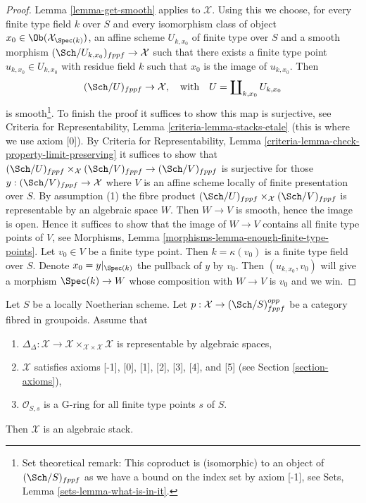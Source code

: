 \begin{proof}
Lemma \ref{lemma-get-smooth} applies to $\mathcal{X}$. Using this we
choose, for every finite type field $k$ over $S$ and every
isomorphism class of object $x_0 \in \Ob(\mathcal{X}_{\Spec(k)})$,
an affine scheme $U_{k, x_0}$ of finite type over $S$ and a smooth morphism
$(\Sch/U_{k, x_0})_{fppf} \to \mathcal{X}$ such that there exists a finite
type point $u_{k, x_0} \in U_{k, x_0}$ with residue field $k$ such that $x_0$
is the image of $u_{k, x_0}$. Then
$$
(\Sch/U)_{fppf} \to \mathcal{X},
\quad\text{with}\quad
U = \coprod\nolimits_{k, x_0} U_{k, x_0}
$$
is smooth\footnote{Set theoretical remark: This coproduct is (isomorphic)
to an object of $(\Sch/S)_{fppf}$ as we have a bound on the index set
by axiom [-1], see Sets, Lemma \ref{sets-lemma-what-is-in-it}.}.
To finish the proof it suffices to show this map is surjective,
see Criteria for Representability, Lemma \ref{criteria-lemma-stacks-etale}
(this is where we use axiom [0]). By Criteria for Representability, Lemma
\ref{criteria-lemma-check-property-limit-preserving}
it suffices to show that
$(\Sch/U)_{fppf} \times_\mathcal{X} (\Sch/V)_{fppf} \to (\Sch/V)_{fppf}$
is surjective for those $y : (\Sch/V)_{fppf} \to \mathcal{X}$ where
$V$ is an affine scheme locally of finite presentation
over $S$. By assumption (1) the fibre product
$(\Sch/U)_{fppf} \times_\mathcal{X} (\Sch/V)_{fppf}$ is representable
by an algebraic space $W$. Then $W \to V$ is smooth, hence the image is
open. Hence it suffices to show that the image of $W \to V$ contains all
finite type points of $V$, see
Morphisms, Lemma \ref{morphisms-lemma-enough-finite-type-points}.
Let $v_0 \in V$ be a finite type point. Then $k = \kappa(v_0)$ is
a finite type field over $S$. Denote $x_0 = y|_{\Spec(k)}$
the pullback of $y$ by $v_0$. Then $(u_{k, x_0}, v_0)$ will give
a morphism $\Spec(k) \to W$ whose composition with $W \to V$
is $v_0$ and we win.
\end{proof}

\begin{proposition}
\label{proposition-second-diagonal-representable}
Let $S$ be a locally Noetherian scheme. Let
$p : \mathcal{X} \to (\Sch/S)_{fppf}^{opp}$ be a category fibred in groupoids.
Assume that
\begin{enumerate}
\item $\Delta_\Delta : \mathcal{X} \to
\mathcal{X} \times_{\mathcal{X} \times \mathcal{X}} \mathcal{X}$
is representable by algebraic spaces,
\item $\mathcal{X}$ satisfies axioms [-1], [0], [1], [2], [3], [4], and [5]
(see Section \ref{section-axioms}),
\item $\mathcal{O}_{S, s}$ is a G-ring for all finite type points $s$ of $S$.
\end{enumerate}
Then $\mathcal{X}$ is an algebraic stack.
\end{proposition}

